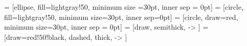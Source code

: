 \documentclass[11pt]{article}
\newcommand{\ver}{\arrowvert \;}
\begin{document}
 = [ellipse, fill=lightgray!50, minimum size =30pt, inner sep = 0pt]
 = [circle, fill=lightgray!50, minimum size=30pt, inner sep=0pt]
 = [circle, draw=red, minimum size=30pt, inner sep = 0pt]
 = [draw, semithick, -> ] 
 = [draw=red!50!black, dashed, thick, -> ] 
\begin{figure}[h]\centering
\begin{tabular}{@{}c@{}}
\toprule









\end{tabular}
\end{figure}
\end{document}
